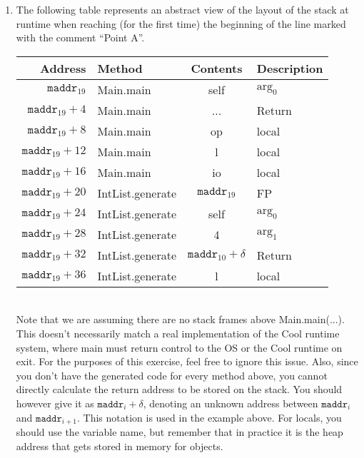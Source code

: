 \documentclass[11pt]{article}
\begin{document}
\begin{enumerate}
\begin{enumerate}
   \newpage
    \item The following table represents an abstract view of the layout of the stack at runtime when reaching (for the first time) the beginning of the line marked with the comment ``Point A''. \\
    
    \begin{tabular}{ | r | l | c | l | }
    \hline
    Address & Method & Contents & Description \\
    \hline
    $\mathtt{maddr}_{19}$ & Main.main & self & $\mbox{arg}_0$ \\
    \hline
    $\mathtt{maddr}_{19}+4$ & Main.main & ... & Return \\
    \hline
    $\mathtt{maddr}_{19}+8$ & Main.main & op & local \\
    \hline
    $\mathtt{maddr}_{19}+12$ & Main.main & l & local \\
    \hline
    $\mathtt{maddr}_{19}+16$ & Main.main & io & local \\
    \hline
    $\mathtt{maddr}_{19}+20$ & IntList.generate & $\mathtt{maddr}_{19}$ & FP \\
    \hline
    $\mathtt{maddr}_{19}+24$ & IntList.generate & self & $\mbox{arg}_0$ \\
    \hline
    $\mathtt{maddr}_{19}+28$ & IntList.generate & 4 & $\mbox{arg}_1$ \\
    \hline
    $\mathtt{maddr}_{19}+32$ & IntList.generate & $\mathtt{maddr}_{10}+\delta$ & Return \\
    \hline
    $\mathtt{maddr}_{19}+36$ & IntList.generate & l & local \\
    \hline
    \end{tabular} \\
    
    Note that we are assuming there are no stack frames above Main.main(...). This doesn't necessarily match a real implementation of the Cool runtime system, where main must return control to the OS or the Cool runtime on exit. For the purposes of this exercise, feel free to ignore this issue. Also, since you don't have the generated code for every method above, you cannot directly calculate the return address to be stored on the stack. You should however give it as $\mathtt{maddr}_{i}+\delta$, denoting an unknown address between $\mathtt{maddr}_{i}$ and $\mathtt{maddr}_{i+1}$. This notation is used in the example above. For locals, you should use the variable name, but remember that in practice it is the heap address that gets stored in memory for objects.
    

\end{enumerate}
\end{enumerate}
\end{document}
